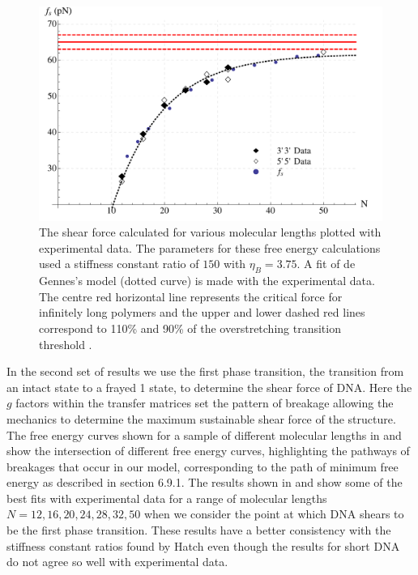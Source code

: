 %
\begin{figure}[H]
\centering
\includegraphics[scale=0.65]{Results/DNA/dna_large_etab/shear_force_large_ksr150_etab3p75.pdf}
\caption{The shear force calculated for various molecular lengths plotted with experimental data. The parameters for these free energy calculations used a stiffness constant ratio of $150$ with $\eta_B = 3.75$. A fit of de Gennes's model (dotted curve) is made with the experimental data. The centre red horizontal line represents the critical force for infinitely long polymers and the upper and lower dashed red lines correspond to 110\% and 90\% of the overstretching transition threshold \cite{Hatch2008}.}
\label{fig:dna_large_etab1} 
\end{figure}
%
In the second set of results we use the first phase transition, the transition from an intact state to a frayed 1 state, to determine the shear force of DNA. Here the $g$ factors within the transfer matrices set the pattern of breakage allowing the mechanics to determine the maximum sustainable shear force of the structure. The free energy curves shown for a sample of different molecular lengths in  and  show the intersection of different free energy curves, highlighting the pathways of breakages that occur in our model, corresponding to the path of minimum free energy as described in section 6.9.1. The results shown in  and  show some of the best fits with experimental data for a range of molecular lengths $N=12,16,20,24,28,32,50$ when we consider the point at which DNA shears to be the first phase transition. These results have a better consistency with the stiffness constant ratios found by Hatch \cite{Hatch2008} even though the results for short DNA do not agree so well with experimental data. 
